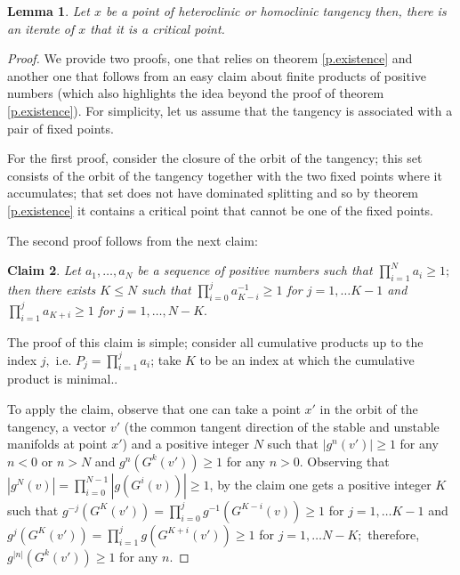 \documentclass[a4paper,11pt]{article}
\newtheorem{lemma}{Lemma}
\newtheorem{claim}[lemma]{Claim}
\theoremstyle{definition}
\begin{document}
\begin{lemma}\label{lem:tang-crit} Let $x$ be a point of  heteroclinic or homoclinic tangency then, there is an iterate of $x$ that it is a critical point.
    
\end{lemma}

\begin{proof} We provide two proofs, one that relies on theorem \ref{p.existence} and another one that follows from an easy claim about finite products of positive numbers (which also highlights the idea beyond the proof of theorem \ref{p.existence}). For simplicity, let us assume that the tangency is associated with a pair of fixed points.

For the first proof, consider the closure of the orbit of the tangency; this set consists of the orbit of the tangency together with the two fixed points where it accumulates; that set does not have dominated splitting and so by theorem \ref{p.existence} it contains a critical point that cannot be one of the fixed points.

The second proof follows from the next claim:

\begin{claim}\label{cl:product} Let $a_1,\dots, a_N$ be a sequence of positive numbers such that $\prod_{i=1}^N a_i\geq 1;$ then there exists $K\leq N $ such that $\prod_{i=0}^{j} a_{K-i}^{-1}\geq 1$ for $j=1,\dots K-1$ and $\prod_{i=1}^{j} a_{K+i}\geq 1 $ for $j=1,\dots, N-K.$
    
\end{claim}

The proof of this claim is simple; consider all cumulative products up to the index $j,$ i.e. $P_j=\prod_{i=1}^j a_i$; take  $K$ to be an index at which the cumulative product is minimal..

To apply the claim, observe that one can take a point $x'$ in the orbit of the tangency, a vector $v'$ (the common tangent direction of the stable and unstable manifolds at point $x'$) and a positive integer $N$ such that $|g^{n}(v')|\geq 1$ for any $n<0$ or $n>N$ and $g^n(G^k(v'))\geq 1$ for any $n>0$. Observing that $|g^N(v)|=\prod_{i=0}^{N-1}|g(G^i(v))|\geq 1$, by the claim one gets a positive integer $K$ such that $ g^{-j}(G^K(v'))=\prod_{i=0}^{j} g^{-1}(G^{K-i}(v))\geq 1$ for $j=1,\dots K-1$ and $g^j(G^K(v'))=\prod_{i=1}^{j} g(G^{K+i}(v'))\geq 1 $ for $j=1,\dots N-K;$ therefore, $g^{|n|}(G^k(v'))\geq 1$ for any $n.$ 
    
\end{proof}
\end{document}
